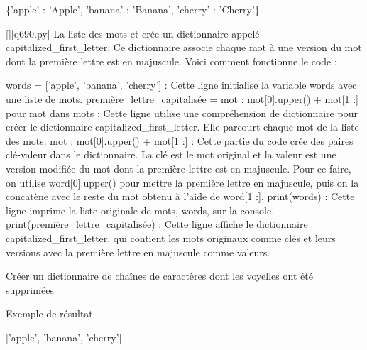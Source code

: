 \{'apple' : 'Apple', 'banana' : 'Banana', 'cherry' : 'Cherry'\}
        \par
        \begin{solution}
            \renewcommand{\nomfichier}{q690.py}
            \pythonfile{\chemincode \nomfichier}[][\nomfichier]
            La liste des mots et crée un dictionnaire appelé capitalized_first_letter. Ce dictionnaire associe chaque mot à une version du mot dont la première lettre est en majuscule. Voici comment fonctionne le code :

    words = ['apple', 'banana', 'cherry'] : Cette ligne initialise la variable words avec une liste de mots.
    première_lettre_capitalisée = {mot : mot[0].upper() + mot[1 :] pour mot dans mots} : Cette ligne utilise une compréhension de dictionnaire pour créer le dictionnaire capitalized_first_letter. Elle parcourt chaque mot de la liste des mots.
        {mot : mot[0].upper() + mot[1 :]} : Cette partie du code crée des paires clé-valeur dans le dictionnaire. La clé est le mot original et la valeur est une version modifiée du mot dont la première lettre est en majuscule. Pour ce faire, on utilise word[0].upper() pour mettre la première lettre en majuscule, puis on la concatène avec le reste du mot obtenu à l'aide de word[1 :].
    print(words) : Cette ligne imprime la liste originale de mots, words, sur la console.
    print(première_lettre_capitalisée) : Cette ligne affiche le dictionnaire capitalized_first_letter, qui contient les mots originaux comme clés et leurs versions avec la première lettre en majuscule comme valeurs.
        \end{solution}
        

        \question
        Créer un dictionnaire de chaînes de caractères dont les voyelles ont été supprimées

Exemple de résultat

['apple', 'banana', 'cherry']

